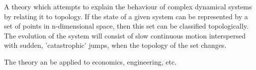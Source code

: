 A theory which attempts to explain the behaviour of complex dynamical systems by
relating it to topology. If the state of a given system can be represented
by a set of points in n-dimensional space, then this set can be classified 
topologically. The evolution of the system will consist  of slow continuous motion
interspersed with sudden, 'catastrophic' jumps, when the topology of the set changes.
\par
The theory an be applied to economics, engineering, etc.